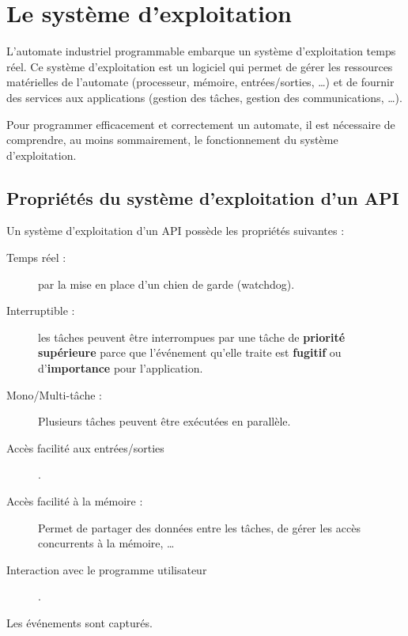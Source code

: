 
\section{Le système d'exploitation}
L'automate industriel programmable embarque un système d'exploitation temps réel. Ce système d'exploitation est un logiciel qui permet de gérer les ressources matérielles de l'automate (processeur, mémoire, entrées/sorties, \dots) et de fournir des services aux applications (gestion des tâches, gestion des communications, \dots). 

Pour programmer efficacement et correctement un automate, il est nécessaire de comprendre, au moins sommairement, le fonctionnement du système d'exploitation.


\subsection{Propriétés du système d'exploitation d'un API}
Un système d'exploitation d'un API possède les propriétés suivantes : 
\begin{description}
    \item[Temps réel : ] par la mise en place d'un chien de garde (watchdog).
    \item[Interruptible : ] les tâches peuvent être interrompues par une tâche de \textbf{priorité supérieure} parce que l'événement qu'elle traite est \textbf{fugitif} ou d'\textbf{importance} pour l'application.
    \item[Mono/Multi-tâche : ] Plusieurs tâches peuvent être exécutées en parallèle. 
    \item[Accès facilité aux entrées/sorties].
    \item[Accès facilité à la mémoire : ] Permet de partager des données entre les tâches, de gérer les accès concurrents à la mémoire, \dots
    \item[Interaction avec le programme utilisateur]. 
\end{description}

Les événements sont capturés.
